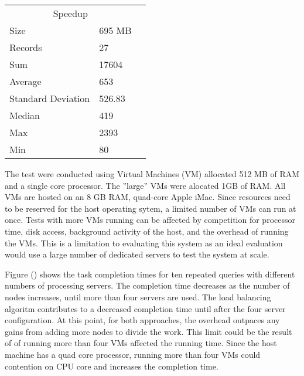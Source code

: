 \documentclass{article}
\begin{document}
\begin{multicols}{2}
\begin{tabular}{llr}
\hline
\multicolumn{2}{c}{Speedup} \\
\cline{1-2}
Size & 695 MB \\
Records & 27 \\
Sum & 17604 \\
Average & 653 \\ 
Standard Deviation & 526.83 \\
Median & 419 \\
Max & 2393 \\
Min & 80 \\
\hline
\end{tabular}




The test were conducted using Virtual Machines (VM) allocated 512 MB of RAM and a single core processor. The ''large'' VMs were alocated 1GB of RAM.  All VMs are hosted on an 8 GB RAM, quad-core Apple iMac. Since resources need to be reserved for the host operating sytem, a limited number of VMs can run at once.  Tests with more VMs running can be affected by competition for processor time, disk access, background activity of the host, and the overhead of running the VMs.  This is a limitation to evaluating this system as an ideal evaluation would use a large number of dedicated servers to test the system at scale.

Figure () shows the task completion times for ten repeated queries with different numbers of processing servers.  The completion time decreases as the number of nodes increases, until more than four servers are used. The load balancing algoritm contributes to a decreased completion time until after the four server configuration.  At this point, for both approaches, the overhead outpaces any gains from adding more nodes to divide the work.  This limit could be the result of of running more than four VMs affected the running time.  Since the host machine has a quad core processor, running more than four VMs could contention on CPU core and increases the completion time.


\end{multicols}
\end{document}
